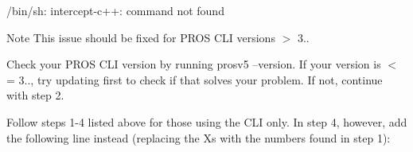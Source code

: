 /bin/sh\+: intercept-\/c++\+: command not found

\begin{DoxyNote}{Note}
This issue should be fixed for P\+R\+OS C\+LI versions $>$ 3..
\end{DoxyNote}

\begin{DoxyEnumerate}
\item Check your P\+R\+OS C\+LI version by running prosv5 --version. If your version is $<$= 3.., try updating first to check if that solves your problem. If not, continue with step 2.
\item Follow steps 1-\/4 listed above for those using the C\+LI only. In step 4, however, add the following line instead (replacing the Xs with the numbers found in step 1)\+:
\end{DoxyEnumerate}


 